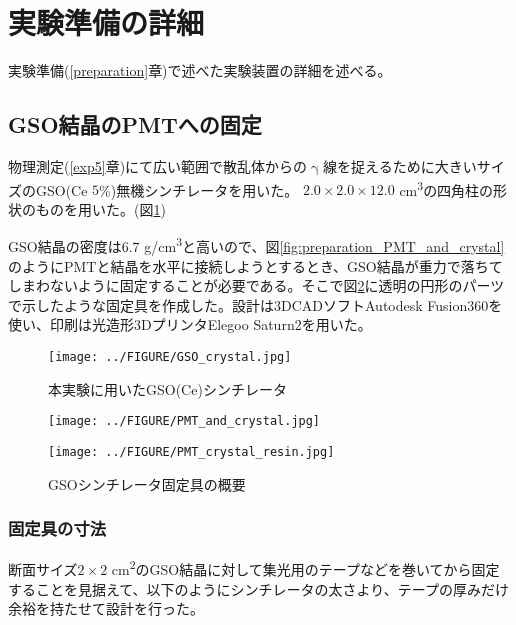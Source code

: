 \documentclass[../../main.tex]{subfiles}
\numberwithin{equation}{section}
\numberwithin{table}{section}
\numberwithin{figure}{section}
\begin{document}
\FloatBarrier
\section{実験準備の詳細}
実験準備(\ref{preparation}章)で述べた実験装置の詳細を述べる。

\subsection{GSO結晶のPMTへの固定}

物理測定(\ref{exp5}章)にて広い範囲で散乱体からの$\upgamma$線を捉えるために大きいサイズのGSO(Ce $5$\%)無機シンチレータを用いた。
$2.0\times2.0\times12.0$ \si{\centi\meter^3}の四角柱の形状のものを用いた。(図\ref{fig:preparation_GSO_crystal})

GSO結晶の密度は$6.7$ \si[per-mode=symbol]{\gram\per\cubic\centi\meter}と高いので、図\ref{fig:preparation_PMT_and_crystal}のようにPMTと結晶を水平に接続しようとするとき、GSO結晶が重力で落ちてしまわないように固定することが必要である。そこで図\ref{fig:preparation_PMT_crystal_resin}に透明の円形のパーツで示したような固定具を作成した。設計は3DCADソフトAutodesk Fusion360を使い、印刷は光造形3DプリンタElegoo Saturn2を用いた。
\begin{figure}[H]
  \centering
  \texttt{[image: ../FIGURE/GSO\_crystal.jpg]}
  \caption{本実験に用いたGSO(Ce)シンチレータ}\label{fig:preparation_GSO_crystal}
\end{figure}

\begin{figure}[H]
  \begin{minipage}[b]{0.48\columnwidth}
    \centering
    \texttt{[image: ../FIGURE/PMT\_and\_crystal.jpg]}
    \label{fig:preparation_PMT_and_crystal}
  \end{minipage}
  \hspace{0.04\columnwidth} %
  \begin{minipage}[b]{0.48\columnwidth}
    \centering
    \texttt{[image: ../FIGURE/PMT\_crystal\_resin.jpg]}
    \label{fig:preparation_PMT_crystal_resin}
  \end{minipage}
  \caption{GSOシンチレータ固定具の概要}
\end{figure}

\subsubsection{固定具の寸法}
  断面サイズ$2\times2$ \si{\square\centi\meter}のGSO結晶に対して集光用のテープなどを巻いてから固定することを見据えて、以下のようにシンチレータの太さより、テープの厚みだけ余裕を持たせて設計を行った。
\end{document}
